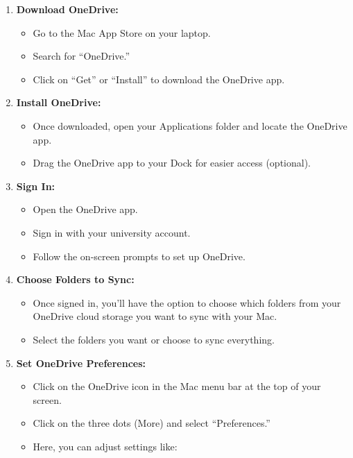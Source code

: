 \documentclass[
]{book}
\providecommand{\tightlist}{%
  \setlength{\itemsep}{0pt}\setlength{\parskip}{0pt}}
\begin{document}
\begin{enumerate}
\def\labelenumi{\arabic{enumi}.}
\tightlist
\item
  \textbf{Download OneDrive:}

  \begin{itemize}
  \tightlist
  \item
    Go to the Mac App Store on your laptop.
  \item
    Search for ``OneDrive.''
  \item
    Click on ``Get'' or ``Install'' to download the OneDrive app.
  \end{itemize}
\item
  \textbf{Install OneDrive:}

  \begin{itemize}
  \tightlist
  \item
    Once downloaded, open your Applications folder and locate the OneDrive app.
  \item
    Drag the OneDrive app to your Dock for easier access (optional).
  \end{itemize}
\item
  \textbf{Sign In:}

  \begin{itemize}
  \tightlist
  \item
    Open the OneDrive app.
  \item
    Sign in with your university account.
  \item
    Follow the on-screen prompts to set up OneDrive.
  \end{itemize}
\item
  \textbf{Choose Folders to Sync:}

  \begin{itemize}
  \tightlist
  \item
    Once signed in, you'll have the option to choose which folders from your OneDrive cloud storage you want to sync with your Mac.
  \item
    Select the folders you want or choose to sync everything.
  \end{itemize}
\item
  \textbf{Set OneDrive Preferences:}

  \begin{itemize}
  \tightlist
  \item
    Click on the OneDrive icon in the Mac menu bar at the top of your screen.
  \item
    Click on the three dots (More) and select ``Preferences.''
  \item
    Here, you can adjust settings like:


\end{itemize}
\end{enumerate}
\end{document}
